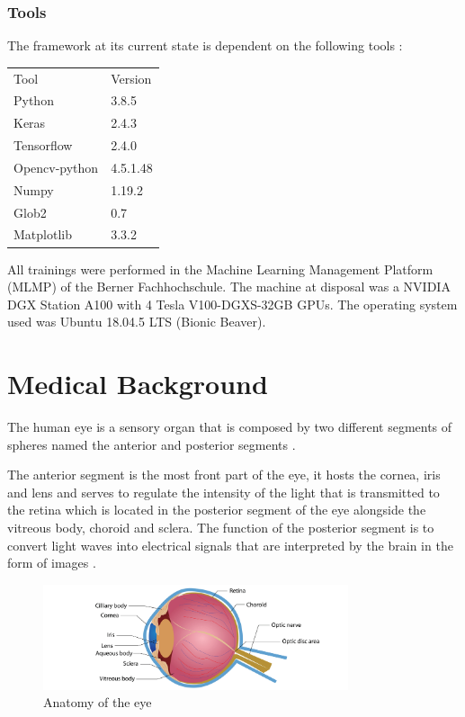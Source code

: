 \documentclass[12pt,a4paper]{scrartcl}
\begin{document}
\subsubsection{Tools}
The framework at its current state is dependent on the following tools : 
    
    \begin{table}[H]
    \begin{tabular}{ll}
    Tool & Version \\
    Python & 3.8.5 \\
    Keras     & 2.4.3   \\
    Tensorflow & 2.4.0 \\
    Opencv-python  &   4.5.1.48 \\
    Numpy & 1.19.2 \\
    Glob2  &  0.7 \\
    Matplotlib & 3.3.2
    \end{tabular}
    \end{table}

All trainings were performed in the Machine Learning Management Platform (MLMP) of the Berner Fachhochschule. The machine at disposal was a NVIDIA DGX Station A100 with 4 Tesla V100-DGXS-32GB GPUs. The operating system used was Ubuntu 18.04.5 LTS (Bionic Beaver).

\section{Medical Background}\label{s:medical_background}

The human eye is a sensory organ that is composed by two different segments of spheres named the anterior and posterior segments \cite{snell1998}.

The anterior segment is the most front part of the eye, it hosts the cornea, iris and lens and serves to regulate the intensity of the light that is transmitted to the retina which is located in the posterior segment of the eye alongside the vitreous body, choroid and sclera. The function of the posterior segment is to convert light waves into electrical signals that are interpreted by the brain in the form of images \cite{Rhoades2017}. 

\begin{figure}[H]
    \centering
    \includegraphics[width=0.8\textwidth]{./images/anatomy-of-the-eye.jpg}
    \caption{Anatomy of the eye \cite{eyeanatomy-pic}}
    \label{fig:eye-anatomy}
\end{figure}
\end{document}
